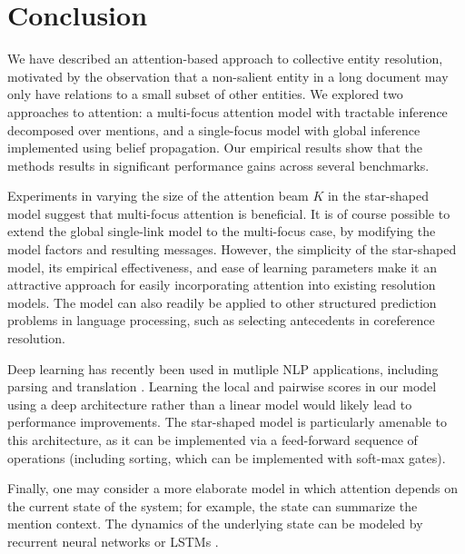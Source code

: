 \section{Conclusion}
\label{sec:End}

We have described an attention-based approach to collective entity resolution,
motivated by the observation that a non-salient entity in a long document may
 only have relations to a small subset of other entities. 
 We explored two approaches to attention: a multi-focus attention model
 with tractable inference decomposed over mentions, and a single-focus
model with global inference implemented using belief propagation.
Our empirical results show that the methods results in significant performance gains
across several benchmarks. 

Experiments in varying the size of the attention beam $K$ in the star-shaped model suggest that
 multi-focus attention is beneficial.
 It is of course possible to extend the global
 single-link model to the multi-focus case, by modifying the model
 factors and resulting messages. 
 However, the simplicity of the star-shaped model, its empirical effectiveness, and ease of learning parameters make it an attractive approach for easily incorporating attention into existing resolution models. The model can also readily be applied 
to other structured prediction problems in language processing, such as
selecting antecedents in coreference resolution.


Deep learning has recently been used in mutliple NLP applications, including parsing \cite{chen2014fast} and translation \cite{bahdanau2014neural}. 
Learning the local and pairwise scores in our model using a deep architecture rather
than a linear model would likely lead to performance improvements.
The star-shaped model is particularly amenable to this architecture, as it can be implemented via
a feed-forward sequence of operations (including sorting, which can be implemented with soft-max gates).

Finally, one may consider a more elaborate model in which attention
 depends on the current state of the system; 
 for example, the state can summarize the mention context.
The dynamics of the underlying state can be modeled by
recurrent neural networks or LSTMs \cite{bahdanau2014neural}. 

